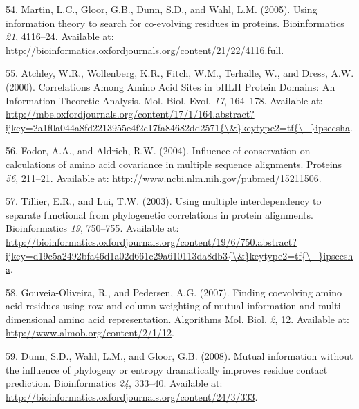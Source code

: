 \documentclass[11pt,a4paper,twoside]{book}
\theoremstyle{definition}
\theoremstyle{definition}
\theoremstyle{remark}
\begin{document}
\hypertarget{ref-Martin2005}{}
54. Martin, L.C., Gloor, G.B., Dunn, S.D., and Wahl, L.M. (2005). Using
information theory to search for co-evolving residues in proteins.
Bioinformatics \emph{21}, 4116--24. Available at:
\url{http://bioinformatics.oxfordjournals.org/content/21/22/4116.full}.

\hypertarget{ref-Atchley2000}{}
55. Atchley, W.R., Wollenberg, K.R., Fitch, W.M., Terhalle, W., and
Dress, A.W. (2000). Correlations Among Amino Acid Sites in bHLH Protein
Domains: An Information Theoretic Analysis. Mol. Biol. Evol. \emph{17},
164--178. Available at:
\href{http://mbe.oxfordjournals.org/content/17/1/164.abstract?ijkey=2a1f0a044a8fd2213955e4f2c17fa84682dd2571\%7B/\&\%7Dkeytype2=tf\%7B/_\%7Dipsecsha}{http://mbe.oxfordjournals.org/content/17/1/164.abstract?ijkey=2a1f0a044a8fd2213955e4f2c17fa84682dd2571\{\textbackslash{}\&\}keytype2=tf\{\textbackslash{}\_\}ipsecsha}.

\hypertarget{ref-Fodor2004}{}
56. Fodor, A.A., and Aldrich, R.W. (2004). Influence of conservation on
calculations of amino acid covariance in multiple sequence alignments.
Proteins \emph{56}, 211--21. Available at:
\url{http://www.ncbi.nlm.nih.gov/pubmed/15211506}.

\hypertarget{ref-Tillier2003}{}
57. Tillier, E.R., and Lui, T.W. (2003). Using multiple interdependency
to separate functional from phylogenetic correlations in protein
alignments. Bioinformatics \emph{19}, 750--755. Available at:
\href{http://bioinformatics.oxfordjournals.org/content/19/6/750.abstract?ijkey=d19c5a2492bfa46d1a02d661c29a610113da8db3\%7B/\&\%7Dkeytype2=tf\%7B/_\%7Dipsecsha}{http://bioinformatics.oxfordjournals.org/content/19/6/750.abstract?ijkey=d19c5a2492bfa46d1a02d661c29a610113da8db3\{\textbackslash{}\&\}keytype2=tf\{\textbackslash{}\_\}ipsecsha}.

\hypertarget{ref-Gouveia_Oliveira2007}{}
58. Gouveia-Oliveira, R., and Pedersen, A.G. (2007). Finding coevolving
amino acid residues using row and column weighting of mutual information
and multi-dimensional amino acid representation. Algorithms Mol. Biol.
\emph{2}, 12. Available at: \url{http://www.almob.org/content/2/1/12}.

\hypertarget{ref-Dunn2008}{}
59. Dunn, S.D., Wahl, L.M., and Gloor, G.B. (2008). Mutual information
without the influence of phylogeny or entropy dramatically improves
residue contact prediction. Bioinformatics \emph{24}, 333--40. Available
at: \url{http://bioinformatics.oxfordjournals.org/content/24/3/333}.
\end{document}
